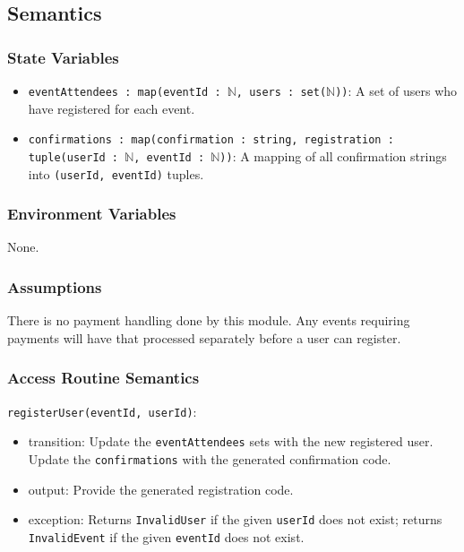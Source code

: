 \documentclass[12pt, titlepage]{article}
\begin{document}
\subsection{Semantics}

\subsubsection{State Variables}
\begin{itemize}
  \item \texttt{eventAttendees : map(eventId : $\mathbb{N}$, users :
    set($\mathbb{N}$))}: A set of users who have registered for each event.
  \item \texttt{confirmations : map(confirmation : string, registration : tuple(userId : $\mathbb{N}$, eventId :
    $\mathbb{N}$))}: A mapping of all confirmation strings into \texttt{(userId, eventId)} tuples.
\end{itemize}



\subsubsection{Environment Variables}
None.

\subsubsection{Assumptions}
There is no payment handling done by this module. Any events requiring payments will have that processed separately
before a user can register.

\subsubsection{Access Routine Semantics}

\noindent \texttt{registerUser(eventId, userId)}:
\begin{itemize}
  \item transition: Update the \texttt{eventAttendees} sets with the new registered user. Update the
    \texttt{confirmations} with the generated confirmation code.
\item output: Provide the generated registration code.
\item exception: Returns \texttt{InvalidUser} if the given \texttt{userId} does not exist; returns \texttt{InvalidEvent} if the given \texttt{eventId} does not exist.
\end{itemize}
\end{document}
